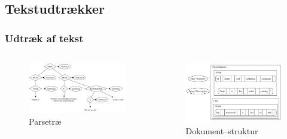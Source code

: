 \documentclass{beamer}
\begin{document}
\subsection{Tekstudtrækker}
\begin{frame}
  \frametitle{Udtræk af tekst}

  \begin{columns}[t]
    \begin{figure}
      \includegraphics[width=\textwidth]{parsetree.pdf}
      \caption{Parsetræ}
    \end{figure}

    \pause

    \begin{figure}
      \includegraphics[width=\textwidth]{documentill.pdf}
      \caption{Dokument--struktur}
    \end{figure}
  \end{columns}
\end{frame}
\end{document}
